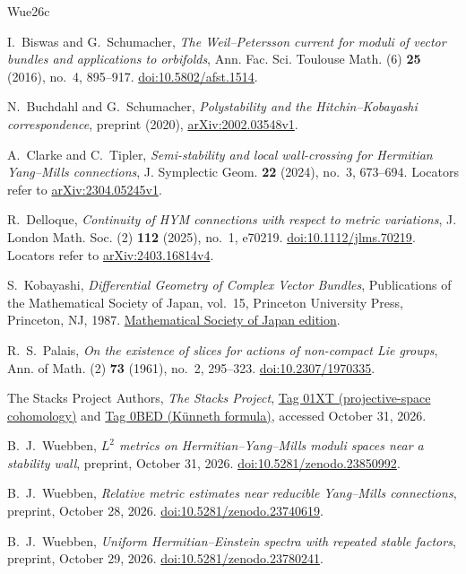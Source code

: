 \documentclass[11pt]{amsart}
\theoremstyle{definition}
\theoremstyle{remark}
\begin{document}
\FloatBarrier
\begin{thebibliography}{Wue26c}

I.~Biswas and G.~Schumacher,
\emph{The Weil--Petersson current for moduli of vector bundles and applications to orbifolds},
Ann. Fac. Sci. Toulouse Math. (6) \textbf{25} (2016), no.~4, 895--917.
\href{https://doi.org/10.5802/afst.1514}{doi:10.5802/afst.1514}.

N.~Buchdahl and G.~Schumacher,
\emph{Polystability and the Hitchin--Kobayashi correspondence}, preprint (2020),
\href{https://arxiv.org/abs/2002.03548v1}{arXiv:2002.03548v1}.

A.~Clarke and C.~Tipler,
\emph{Semi-stability and local wall-crossing for Hermitian Yang--Mills connections},
J. Symplectic Geom. \textbf{22} (2024), no.~3, 673--694.
Locators refer to \href{https://arxiv.org/abs/2304.05245v1}{arXiv:2304.05245v1}.

R.~Delloque, \emph{Continuity of HYM connections with respect to metric variations},
J. London Math. Soc. (2) \textbf{112} (2025), no.~1, e70219.
\href{https://doi.org/10.1112/jlms.70219}{doi:10.1112/jlms.70219}.
Locators refer to \href{https://arxiv.org/abs/2403.16814v4}{arXiv:2403.16814v4}.

S.~Kobayashi, \emph{Differential Geometry of Complex Vector Bundles},
Publications of the Mathematical Society of Japan, vol.~15,
Princeton University Press, Princeton, NJ, 1987.
\href{https://www.mathsoc.jp/assets/pdf/publications/pubmsj/Vol15.pdf}{Mathematical Society of Japan edition}.

R.~S.~Palais, \emph{On the existence of slices for actions of non-compact Lie groups},
Ann. of Math. (2) \textbf{73} (1961), no.~2, 295--323.
\href{https://doi.org/10.2307/1970335}{doi:10.2307/1970335}.

The Stacks Project Authors, \emph{The Stacks Project},
\href{https://stacks.math.columbia.edu/tag/01XT}{Tag 01XT (projective-space cohomology)} and
\href{https://stacks.math.columbia.edu/tag/0BED}{Tag 0BED (K\"unneth formula)},
accessed October 31, 2026.

B.~J.~Wuebben, \emph{$L^2$ metrics on Hermitian--Yang--Mills moduli spaces near a stability wall},
preprint, October 31, 2026.
\href{https://doi.org/10.5281/zenodo.23850992}{doi:10.5281/zenodo.23850992}.

B.~J.~Wuebben, \emph{Relative metric estimates near reducible Yang--Mills connections},
preprint, October 28, 2026.
\href{https://doi.org/10.5281/zenodo.23740619}{doi:10.5281/zenodo.23740619}.

B.~J.~Wuebben, \emph{Uniform Hermitian--Einstein spectra with repeated stable factors},
preprint, October 29, 2026.
\href{https://doi.org/10.5281/zenodo.23780241}{doi:10.5281/zenodo.23780241}.

\end{thebibliography}
\end{document}
